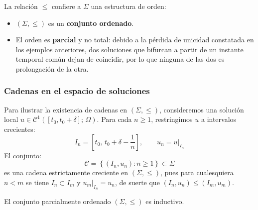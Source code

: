 La relación $\leq$ confiere a $\Sigma$ una estructura de orden:
\begin{itemize}
    \item $(\Sigma, \leq)$ es un \textbf{conjunto ordenado}.
    \item El orden es \textbf{parcial} y no total: debido a la pérdida de unicidad constatada en los ejemplos anteriores, dos soluciones que bifurcan a partir de un instante temporal común dejan de coincidir, por lo que ninguna de las dos es prolongación de la otra.
\end{itemize}

\subsubsection{Cadenas en el espacio de soluciones}

Para ilustrar la existencia de cadenas en $(\Sigma, \leq)$, consideremos una solución local $u \in \mathcal{C}^1([t_0, t_0 + \delta]; \, \Omega)$. Para cada $n \geq 1$, restringimos $u$ a intervalos crecientes:
\[
    I_n = \left[ t_0, \, t_0 + \delta - \frac{1}{n} \right], \qquad u_n = u\big|_{I_n}
\]
El conjunto:
\[
    \mathcal{C} = \left\{ (I_n, u_n) : n \geq 1 \right\} \subset \Sigma
\]
es una cadena estrictamente creciente en $(\Sigma, \leq)$, pues para cualesquiera $n < m$ se tiene $I_n \subset I_m$ y $u_m\big|_{I_n} = u_n$, de suerte que $(I_n, u_n) \leq (I_m, u_m)$.

\begin{lema}
    El conjunto parcialmente ordenado $(\Sigma, \leq)$ es inductivo.
\end{lema}


